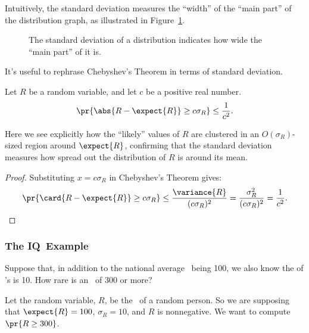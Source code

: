 Intuitively, the standard deviation measures the ``width'' of the ``main
part'' of the distribution graph, as illustrated in
Figure~\ref{fig:stdev}.

\begin{figure}


\caption{The standard deviation of a distribution indicates how wide
  the ``main part'' of it is.}

\label{fig:stdev}

\end{figure}

It's useful to rephrase Chebyshev's Theorem in terms of standard
deviation.
\begin{corollary}
\label{cor:cheby}
Let $R$ be a random variable, and let $c$ be a positive real number.
\[
\pr{\abs{R - \expect{R}} \geq c \sigma_R} \leq \frac{1}{c^2}.
\]
\end{corollary}
Here we see explicitly how the ``likely'' values of $R$ are clustered in
an $O(\sigma_R)$-sized region around $\expect{R}$, confirming that the
standard deviation measures how spread out the distribution of $R$ is
around its mean.

\begin{proof}
  Substituting $x = c \sigma_R$ in Chebyshev's Theorem gives:
  \begin{displaymath}
    \pr{\card{R - \expect{R}} \geq c \sigma_R}
    \leq
    \frac{\variance{R}}{(c \sigma_R)^2}
    =  \frac{\sigma_R^2}{(c \sigma_R)^2}
    = \frac{1}{c^2}.
  \end{displaymath}
\iffalse
  The last equality holds because variance is the square of standard
  deviation: $\variance{R} = \sigma_R^2$.
\fi

\end{proof}

\subsubsection{The IQ\ Example}\label{IQsec}

Suppose that, in addition to the national average \idx{\IQ}\ being 100, we
also know the  of \IQ's is 10.  How rare is an
\IQ\ of 300 or more?

Let the random variable, $R$, be the \IQ\ of a random person.  So we are
supposing that $\expect{R} = 100$, $\sigma_R = 10$, and $R$ is
nonnegative.  We want to compute $\pr{R \geq 300}$.

